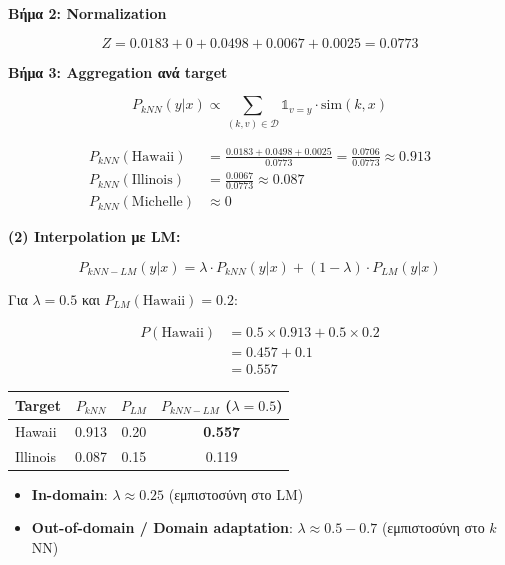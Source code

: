 \textbf{Βήμα 2: Normalization}

$$Z = 0.0183 + 0 + 0.0498 + 0.0067 + 0.0025 = 0.0773$$

\textbf{Βήμα 3: Aggregation ανά target}

$$P_{kNN}(y | x) \propto \sum_{(k,v) \in \mathcal{D}} \mathbb{1}_{v=y} \cdot \text{sim}(k, x)$$

\begin{align*}
P_{kNN}(\text{Hawaii}) &= \frac{0.0183 + 0.0498 + 0.0025}{0.0773} = \frac{0.0706}{0.0773} \approx \mathbf{0.913} \\
P_{kNN}(\text{Illinois}) &= \frac{0.0067}{0.0773} \approx \mathbf{0.087} \\
P_{kNN}(\text{Michelle}) &\approx 0
\end{align*}

\textbf{(2) Interpolation με LM:}

$$P_{kNN-LM}(y | x) = \lambda \cdot P_{kNN}(y | x) + (1-\lambda) \cdot P_{LM}(y | x)$$

Για $\lambda = 0.5$ και $P_{LM}(\text{Hawaii}) = 0.2$:

\begin{align*}
P(\text{Hawaii}) &= 0.5 \times 0.913 + 0.5 \times 0.2 \\
&= 0.457 + 0.1 \\
&= \mathbf{0.557}
\end{align*}

\begin{center}
\begin{tabular}{lccc}
\toprule
\textbf{Target} & $P_{kNN}$ & $P_{LM}$ & $P_{kNN-LM}$ ($\lambda=0.5$) \\
\midrule
Hawaii & 0.913 & 0.20 & \textbf{0.557} \\
Illinois & 0.087 & 0.15 & 0.119 \\
\bottomrule
\end{tabular}
\end{center}

\begin{infobox}
\begin{itemize}
    \item \textbf{In-domain}: $\lambda \approx 0.25$ (εμπιστοσύνη στο LM)
    \item \textbf{Out-of-domain / Domain adaptation}: $\lambda \approx 0.5-0.7$ (εμπιστοσύνη στο $k$NN)
\end{itemize}
\end{infobox}

